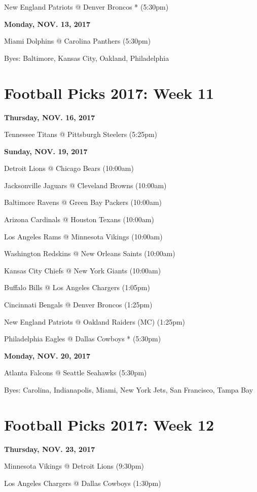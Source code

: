 \documentclass[11pt, letterpaper]{article}
\begin{document}
New England Patriots @ Denver Broncos * (5:30pm)\par
\noindent \normalsize \textbf{Monday, NOV. 13, 2017} \par
Miami Dolphins @ Carolina Panthers (5:30pm)\par
\vfill{}
Byes:  Baltimore,  Kansas City,     Oakland, 
                      Philadelphia
\newpage \section*{\LARGE Football Picks 2017: Week 11}
\noindent \normalsize \textbf{Thursday, NOV.    16, 2017} \par
Tennessee Titans @ Pittsburgh Steelers (5:25pm)\par
\noindent \normalsize \textbf{Sunday, NOV. 19, 2017} \par
Detroit Lions @ Chicago Bears (10:00am)\par
Jacksonville Jaguars @ Cleveland Browns (10:00am)\par
Baltimore Ravens @ Green Bay Packers (10:00am)\par
Arizona Cardinals @ Houston Texans (10:00am)\par
Los Angeles Rams @ Minnesota Vikings (10:00am)\par
Washington Redskins @ New Orleans Saints (10:00am)\par
Kansas City Chiefs @ New York Giants (10:00am)\par
Buffalo Bills @ Los Angeles Chargers (1:05pm)\par
Cincinnati Bengals @ Denver Broncos (1:25pm)\par
New England Patriots @ Oakland Raiders    (MC) (1:25pm)\par
Philadelphia Eagles @ Dallas Cowboys * (5:30pm)\par
\noindent \normalsize \textbf{Monday, NOV. 20, 2017} \par
Atlanta Falcons @ Seattle Seahawks (5:30pm)\par
\vfill{}
Byes:  Carolina,  Indianapolis,     Miami, 
                      New York Jets,  San Francisco,  Tampa Bay
\newpage \section*{\LARGE Football Picks 2017: Week 12}
\noindent \normalsize \textbf{Thursday, NOV.    23, 2017} \par
Minnesota Vikings @ Detroit Lions (9:30pm)\par
Los Angeles Chargers @ Dallas Cowboys (1:30pm)\par
\end{document}
